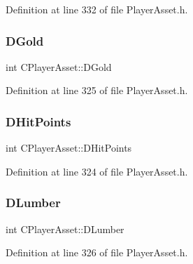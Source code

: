 Definition at line 332 of file Player\+Asset.\+h.

\hypertarget{classCPlayerAsset_ab90ebdc73c6794fd44ddbe273f610292}{}\label{classCPlayerAsset_ab90ebdc73c6794fd44ddbe273f610292} 
\subsubsection{\texorpdfstring{D\+Gold}{DGold}}
{\footnotesize\ttfamily int C\+Player\+Asset\+::\+D\+Gold\hspace{0.3cm}{\ttfamily [protected]}}



Definition at line 325 of file Player\+Asset.\+h.

\hypertarget{classCPlayerAsset_a331750935bf594e665544085fb74e89d}{}\label{classCPlayerAsset_a331750935bf594e665544085fb74e89d} 
\subsubsection{\texorpdfstring{D\+Hit\+Points}{DHitPoints}}
{\footnotesize\ttfamily int C\+Player\+Asset\+::\+D\+Hit\+Points\hspace{0.3cm}{\ttfamily [protected]}}



Definition at line 324 of file Player\+Asset.\+h.

\hypertarget{classCPlayerAsset_af726ea7df9596f02cdb1428d61186349}{}\label{classCPlayerAsset_af726ea7df9596f02cdb1428d61186349} 
\subsubsection{\texorpdfstring{D\+Lumber}{DLumber}}
{\footnotesize\ttfamily int C\+Player\+Asset\+::\+D\+Lumber\hspace{0.3cm}{\ttfamily [protected]}}



Definition at line 326 of file Player\+Asset.\+h.

\hypertarget{classCPlayerAsset_aa57d93e239e9a80c362949f260471456}{}\label{classCPlayerAsset_aa57d93e239e9a80c362949f260471456} 
